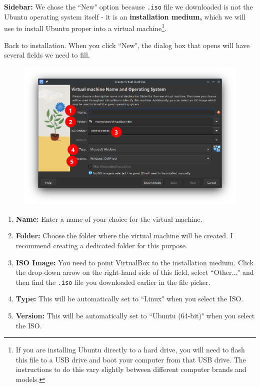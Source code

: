 \documentclass[12pt]{article}
\begin{document}
\textbf{Sidebar:} We chose the ``New" option because \verb|.iso| file we downloaded is not the Ubuntu operating system itself - it is an \textbf{installation medium,} which we will use to install Ubuntu proper into a virtual machine\footnote{If you are installing Ubuntu directly to a hard drive, you will need to flash this file to a USB drive and boot your computer from that USB drive. The instructions to do this vary slightly between different computer brands and models.}.\vspace{5mm}

Back to installation. When you click ``New", the dialog box that opens will have several fields we need to fill.

\begin{figure}[htp]
    \centering
    \includegraphics[width=\textwidth]{1-3.png}
\end{figure}

\begin{enumerate}
    \item \textbf{Name:} Enter a name of your choice for the virtual machine.
    \item \textbf{Folder:} Choose the folder where the virtual machine will be created. I recommend creating a dedicated folder for this purpose.
    \item \textbf{ISO Image:} You need to point VirtualBox to the installation medium. Click the drop-down arrow on the right-hand side of this field, select ``Other..." and then find the \verb|.iso| file you downloaded earlier in the file picker.
    \item \textbf{Type:} This will be automatically set to ``Linux" when you select the ISO.
    \item \textbf{Version:} This will be automatically set to ``Ubuntu (64-bit)" when you select the ISO.
\end{enumerate}
\end{document}
